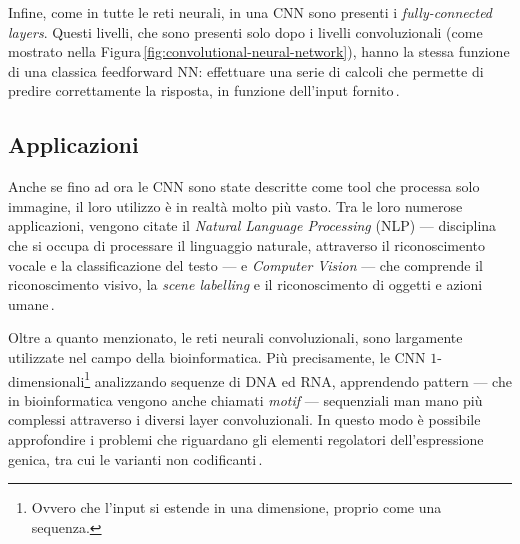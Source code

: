 Infine, come in tutte le reti neurali, in una \acs{CNN} sono presenti i \textit{fully-connected layers}. Questi livelli, che sono presenti solo dopo i livelli convoluzionali (come mostrato nella Figura\,\ref{fig:convolutional-neural-network}), hanno la stessa funzione di una classica feedforward \acs{NN}: effettuare una serie di calcoli che permette di predire correttamente la risposta, in funzione dell'input fornito\,\cite{aggarwal2018neural, o2015introduction}.

\subsection{Applicazioni}

Anche se fino ad ora le \acs{CNN} sono state descritte come tool che processa solo immagine, il loro utilizzo è in realtà molto più vasto. Tra le loro numerose applicazioni, vengono citate il \textit{Natural Language Processing} (\acs{NLP}) — disciplina che si occupa di processare il linguaggio naturale, attraverso il riconoscimento vocale e la classificazione del testo — e \textit{Computer Vision} — che comprende il riconoscimento visivo, la \textit{scene labelling} e il riconoscimento di oggetti e azioni umane\,\cite{shamsaldin2019study, li2021survey, bhatt2021cnn}.

Oltre a quanto menzionato, le reti neurali convoluzionali, sono largamente utilizzate nel campo della bioinformatica. Più precisamente, le \acs{CNN} $1$-dimensionali\footnote{Ovvero che l'input si estende in una dimensione, proprio come una sequenza.} analizzando sequenze di \acs{DNA} ed \acs{RNA}, apprendendo pattern — che in bioinformatica vengono anche chiamati \textit{motif} — sequenziali man mano più complessi attraverso i diversi layer convoluzionali. In questo modo è possibile approfondire i problemi che riguardano gli elementi regolatori dell'espressione genica, tra cui le varianti non codificanti\,\cite{min2017deep}.






\begin{comment}
    Per non diventare matti la notazione è l'opposta di quella sul file di Machine Learnign.
    - ci sono esattamente N feature in un vettore di input, di conseguenza il vettore di pesi è di lunghezza N
    - ci sono esattamente M vettori di input nel dataset, di conseguenza la lunghezza della label è M
    - Il dataset D è composta da j colonne ed i righe
    - Ciascuna riga j rappresenta un elemento del dataset
    - Ciascuna colonna i rappresente un feature del dataset
    
    Di conseguneza D_j indica il vettore j-esimo composto esattamente da N componenti. La label y_j indica il vero valore dell'input processato
\end{comment}

